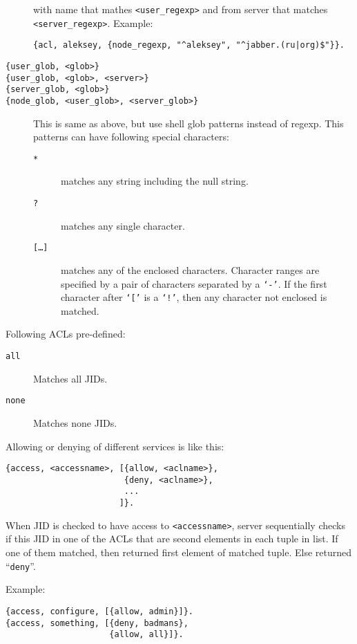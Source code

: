 \documentclass[10pt]{article}
\begin{document}
\begin{description}
  with name that mathes \texttt{<user\_regexp>} and from server that matches
  \texttt{<server\_regexp>}.  Example:
\begin{verbatim}
{acl, aleksey, {node_regexp, "^aleksey", "^jabber.(ru|org)$"}}.
\end{verbatim}
\item[\texttt{\{user\_glob, <glob>\}}]
\item[\texttt{\{user\_glob, <glob>, <server>\}}]
\item[\texttt{\{server\_glob, <glob>\}}]
\item[\texttt{\{node\_glob, <user\_glob>, <server\_glob>\}}] This is same as
  above, but use shell glob patterns instead of regexp.  This patterns can have
  following special characters:
  \begin{description}
  \item[\texttt{*}] matches any string including the null string.
  \item[\texttt{?}] matches any single character.
  \item[\texttt{[\ldots{}]}] matches any of the enclosed characters.  Character
    ranges are specified by a pair of characters separated by a \texttt{`-'}.
    If the first character after \texttt{`['} is a \texttt{`!'}, then any
    character not enclosed is matched.
  \end{description}
\end{description}

Following ACLs pre-defined:
\begin{description}
\item[\texttt{all}] Matches all JIDs.
\item[\texttt{none}] Matches none JIDs.
\end{description}

Allowing or denying of different services is like this:
\begin{verbatim}
{access, <accessname>, [{allow, <aclname>},
                        {deny, <aclname>},
                        ...
                       ]}.
\end{verbatim}
When JID is checked to have access to \texttt{<accessname>}, server
sequentially checks if this JID in one of the ACLs that are second elements in
each tuple in list.  If one of them matched, then returned first element of
matched tuple.  Else returned ``\texttt{deny}''.

Example:
\begin{verbatim}
{access, configure, [{allow, admin}]}.
{access, something, [{deny, badmans},
                     {allow, all}]}.
\end{verbatim}
\end{document}
